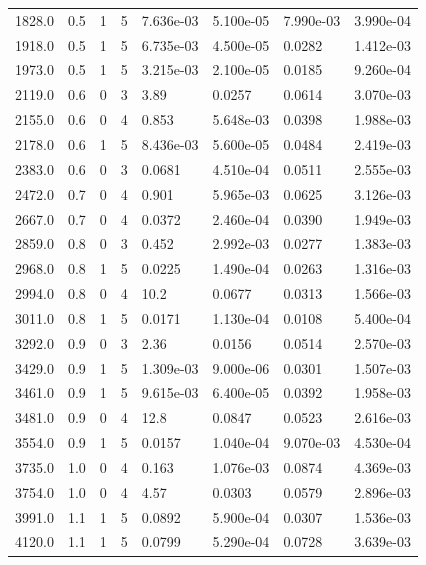 \documentclass[preview]{standalone}
\begin{document}
{{\begin{tabular}{L{1.2cm}C{1.2cm} C{0.3cm}C{0.5cm} C{1.4cm}C{1.4cm} C{1.4cm}C{1.4cm}}
  1828.0  &   0.5  & 1     &  5 &  7.636e-03  & 5.100e-05  & 7.990e-03 &  3.990e-04   \\ 
  1918.0  &   0.5  & 1     &  5 &  6.735e-03  & 4.500e-05  & 0.0282 &  1.412e-03   \\ 
  1973.0  &   0.5  & 1     &  5 &  3.215e-03  & 2.100e-05  & 0.0185 &  9.260e-04   \\ 
  2119.0  &   0.6  & 0     &  3 &  3.89  & 0.0257  & 0.0614 &  3.070e-03   \\ 
  2155.0  &   0.6  & 0     &  4 &  0.853  & 5.648e-03  & 0.0398 &  1.988e-03   \\ 
  2178.0  &   0.6  & 1     &  5 &  8.436e-03  & 5.600e-05  & 0.0484 &  2.419e-03   \\ 
  2383.0  &   0.6  & 0     &  3 &  0.0681  & 4.510e-04  & 0.0511 &  2.555e-03   \\ 
  2472.0  &   0.7  & 0     &  4 &  0.901  & 5.965e-03  & 0.0625 &  3.126e-03   \\ 
  2667.0  &   0.7  & 0     &  4 &  0.0372  & 2.460e-04  & 0.0390 &  1.949e-03   \\ 
  2859.0  &   0.8  & 0     &  3 &  0.452  & 2.992e-03  & 0.0277 &  1.383e-03   \\ 
  2968.0  &   0.8  & 1     &  5 &  0.0225  & 1.490e-04  & 0.0263 &  1.316e-03   \\ 
  2994.0  &   0.8  & 0     &  4 &  10.2  & 0.0677  & 0.0313 &  1.566e-03   \\ 
  3011.0  &   0.8  & 1     &  5 &  0.0171  & 1.130e-04  & 0.0108 &  5.400e-04   \\ 
  3292.0  &   0.9  & 0     &  3 &  2.36  & 0.0156  & 0.0514 &  2.570e-03   \\ 
  3429.0  &   0.9  & 1     &  5 &  1.309e-03  & 9.000e-06  & 0.0301 &  1.507e-03   \\ 
  3461.0  &   0.9  & 1     &  5 &  9.615e-03  & 6.400e-05  & 0.0392 &  1.958e-03   \\ 
  3481.0  &   0.9  & 0     &  4 &  12.8  & 0.0847  & 0.0523 &  2.616e-03   \\ 
  3554.0  &   0.9  & 1     &  5 &  0.0157  & 1.040e-04  & 9.070e-03 &  4.530e-04   \\ 
  3735.0  &   1.0  & 0     &  4 &  0.163  & 1.076e-03  & 0.0874 &  4.369e-03   \\ 
  3754.0  &   1.0  & 0     &  4 &  4.57  & 0.0303  & 0.0579 &  2.896e-03   \\ 
  3991.0  &   1.1  & 1     &  5 &  0.0892  & 5.900e-04  & 0.0307 &  1.536e-03   \\ 
  4120.0  &   1.1  & 1     &  5 &  0.0799  & 5.290e-04  & 0.0728 &  3.639e-03   \\ 

\end{tabular}}}
\end{document}
